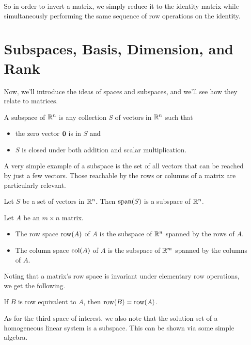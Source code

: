 \documentclass[../m073main.tex]{subfiles}
\begin{document}
So in order to invert a matrix, we simply reduce it to the identity matrix while simultaneously performing the same sequence of row operations on the identity.

\section{Subspaces, Basis, Dimension, and Rank}
Now, we'll introduce the ideas of spaces and subspaces, and we'll see how they relate to matrices.

\begin{definition}[Subspace]
	A subspace of $\mathbb{R}^n$ is any collection $S$ of vectors in $\mathbb{R}^n$ such that
	\begin{itemize}
		\item the zero vector $\mathbf{0}$ is in $S$ and
		\item $S$ is closed under both addition and scalar multiplication.
	\end{itemize}
\end{definition}

A very simple example of a subspace is the set of all vectors that can be reached by just a few vectors.
Those reachable by the rows or columns of a matrix are particularly relevant.

\begin{theorem}
	Let $S$ be a set of vectors in $\mathbb{R}^n$.
	Then $\textrm{span}(S)$ is a subspace of $\mathbb{R}^n$.
\end{theorem}

\begin{definition}
	Let $A$ be an $m\times n$ matrix.
	\begin{itemize}
		\item The row space $\textrm{row}(A)$ of $A$ is the subspace of $\mathbb{R}^n$ spanned by the rows of $A$.
		\item The column space $\textrm{col}(A)$ of $A$ is the subspace of $\mathbb{R}^m$ spanned by the columns of $A$.
	\end{itemize}
\end{definition}

Noting that a matrix's row space is invariant under elementary row operations, we get the following.

\begin{theorem}
	If $B$ is row equivalent to $A$, then $\textrm{row}(B) = \textrm{row}(A)$.
\end{theorem}

As for the third space of interest, we also note that the solution set of a homogeneous linear system is a subspace.
This can be shown via some simple algebra.
\end{document}
